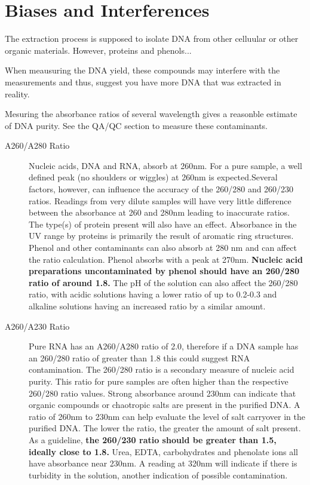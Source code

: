 \documentclass[12pt]{../SOP3_alpha}\usepackage[]{graphicx}\usepackage[]{color}
\begin{document}
\section{Biases and Interferences}

\NP The extraction process is supposed to isolate DNA from other celluular or other organic materials. However, proteins and phenols...  

\NP When meausuring the DNA yield, these compounds may interfere with the measurements and thus, suggest you have more DNA that was extracted in reality. 

\NP Mesuring the absorbance ratios of several wavelength gives a reasonble estimate of DNA purity. See the QA/QC section to measure these contaminants.

\begin{description}
  \item[A260/A280 Ratio] Nucleic acids, DNA and RNA, absorb at 260nm. For a pure sample, a well defined peak (no shoulders or wiggles) at 260nm is expected.Several factors, however, can influence the accuracy of the 260/280 and 260/230 ratios. Readings from very dilute samples will have very little difference between the absorbance at 260 and 280nm leading to inaccurate ratios.  The type(s) of protein present will also have an effect.  Absorbance in the UV range by proteins is primarily the result of aromatic ring structures. Phenol and other contaminants can also absorb at 280 nm and can affect the ratio calculation. Phenol absorbs with a peak at 270nm. \textbf{Nucleic acid preparations uncontaminated by phenol should have an 260/280 ratio of around 1.8. } The pH of the solution can also affect the 260/280 ratio, with acidic solutions having a lower ratio of up to 0.2-0.3 and alkaline solutions having an increased ratio by a similar amount.
  \item[A260/A230 Ratio] Pure RNA has an A260/A280 ratio of 2.0, therefore if a DNA sample has an 260/280 ratio of greater than 1.8 this could suggest RNA contamination. The 260/280 ratio is a secondary measure of nucleic acid purity. This ratio for pure samples are often higher than the respective 260/280 ratio values. Strong absorbance around 230nm can indicate that organic compounds or chaotropic salts are present in the purified DNA.  A ratio of 260nm to 230nm can help evaluate the level of salt carryover in the purified DNA. The lower the ratio, the greater the amount of salt present. As a guideline, \textbf{the 260/230 ratio should be greater than 1.5, ideally close to 1.8.} Urea, EDTA, carbohydrates and phenolate ions all have absorbance near 230nm. A reading at 320nm will indicate if there is turbidity in the solution, another indication of possible contamination.  

\end{description}
\end{document}
